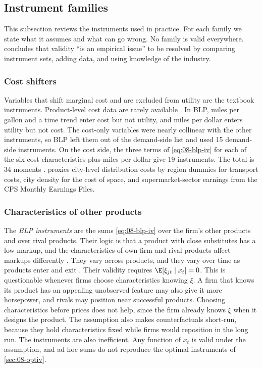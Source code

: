 \subsection{Instrument families}\label{sec:08-iv-families}

This subsection reviews the instruments used in practice. For each family we state what it assumes and what
can go wrong. No family is valid everywhere. \citet[p.~536]{Nevo2000a} concludes that validity ``is an
empirical issue'' to be resolved by comparing instrument sets, adding data, and using knowledge of the industry.

\subsubsection{Cost shifters}
Variables that shift marginal cost and are excluded from utility are the textbook instruments. Product-level
cost data are rarely available \citep[p.~534]{Nevo2000a}. In BLP, miles per gallon and a time trend enter cost
but not utility, and miles per dollar enters utility but not cost. The cost-only variables were nearly collinear
with the other instruments, so BLP left them out of the demand-side list and used 15 demand-side instruments.
On the cost side, the three terms of \eqref{eq:08-blp-iv} for each of the six cost characteristics plus miles per
dollar give 19 instruments. The total is 34 moments \citep[p.~862]{BerryLevinsohnPakes1995}.
\citet[p.~321]{Nevo2001} proxies city-level distribution costs by region dummies for transport costs, city
density for the cost of space, and supermarket-sector earnings from the CPS Monthly Earnings Files.

\subsubsection{Characteristics of other products}
The \emph{BLP instruments} are the sums \eqref{eq:08-blp-iv} over the firm's other products and over rival
products. Their logic is that a product with close substitutes has a low markup, and the characteristics of
own-firm and rival products affect markups differently \citep[p.~855]{BerryLevinsohnPakes1995}. They vary
across products, and they vary over time as products enter and exit \citep[p.~861]{BerryLevinsohnPakes1995}.
Their validity requires $\E[\xi_{jt} \mid x_t] = 0$. This is questionable whenever firms choose characteristics
knowing $\xi$. A firm that knows its product has an appealing unobserved feature may also give it more
horsepower, and rivals may position near successful products. Choosing characteristics before prices does not
help, since the firm already knows $\xi$ when it designs the product. The assumption also makes counterfactuals
short-run, because they hold characteristics fixed while firms would reposition in the long run. The
instruments are also inefficient. Any function of $x_t$ is valid under the assumption, and ad hoc sums do not
reproduce the optimal instruments of \cref{sec:08-optiv}.

